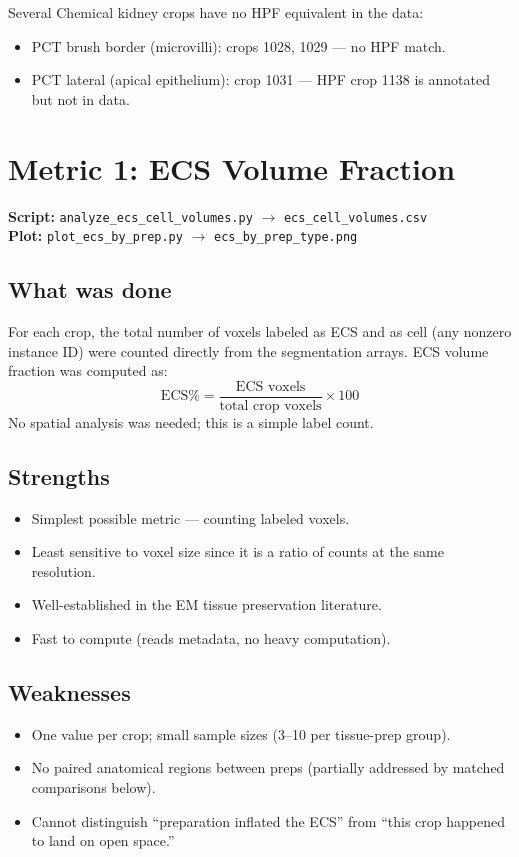 \documentclass[times, twoside]{zHenriquesLab-StyleBioRxiv}
\begin{document}
Several Chemical kidney crops have no HPF equivalent in the data:
\begin{itemize}[nosep]
\item PCT brush border (microvilli): crops 1028, 1029 --- no HPF match.
\item PCT lateral (apical epithelium): crop 1031 --- HPF crop 1138 is annotated but not in data.
\end{itemize}

\section*{Metric 1: ECS Volume Fraction}

{\small\textbf{Script:} \texttt{analyze\_ecs\_cell\_volumes.py}
$\rightarrow$ \texttt{ecs\_cell\_volumes.csv} \\
\textbf{Plot:} \texttt{plot\_ecs\_by\_prep.py}
$\rightarrow$ \texttt{ecs\_by\_prep\_type.png}}

\subsection*{What was done}
For each crop, the total number of voxels labeled as ECS and as cell (any nonzero instance ID) were counted directly from the segmentation arrays. ECS volume fraction was computed as:
\[
\text{ECS\%} = \frac{\text{ECS voxels}}{\text{total crop voxels}} \times 100
\]
No spatial analysis was needed; this is a simple label count.

\subsection*{Strengths}
\begin{itemize}[nosep]
\item Simplest possible metric --- counting labeled voxels.
\item Least sensitive to voxel size since it is a ratio of counts at the same resolution.
\item Well-established in the EM tissue preservation literature.
\item Fast to compute (reads metadata, no heavy computation).
\end{itemize}

\subsection*{Weaknesses}
\begin{itemize}[nosep]
\item One value per crop; small sample sizes (3--10 per tissue-prep group).
\item No paired anatomical regions between preps (partially addressed by matched comparisons below).
\item Cannot distinguish ``preparation inflated the ECS'' from ``this crop happened to land on open space.''
\end{itemize}
\end{document}
